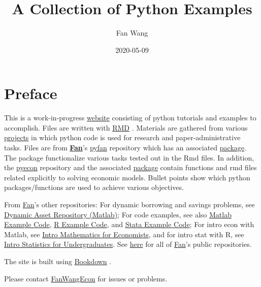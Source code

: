 \documentclass[
]{book}
\title{A Collection of Python Examples}
\author{Fan Wang}
\date{2020-05-09}
\begin{document}
\maketitle

{
\hypersetup{linkcolor=}
\setcounter{tocdepth}{1}
\tableofcontents
}
\hypertarget{preface}{%
\chapter*{Preface}\label{preface}}

This is a work-in-progress \href{https://fanwangecon.github.io/pyfan/}{website} consisting of python tutorials and examples to accomplish. Files are written with \href{https://rmarkdown.rstudio.com/}{RMD} \citep{R-rmarkdown}. Materials are gathered from various \href{https://fanwangecon.github.io/research}{projects} in which python code is used for research and paper-administrative tasks. Files are from \href{https://fanwangecon.github.io/}{\textbf{Fan}}'s \href{https://github.com/FanWangEcon/pyfan}{pyfan} repository which has an associated \href{https://pypi.org/project/pyfan/}{package}. The package functionalize various tasks tested out in the Rmd files. In addition, the \href{https://github.com/FanWangEcon/pyecon}{pyecon} repository and the associated \href{https://pypi.org/project/pyecon/}{package} contain functions and rmd files related explicitly to solving economic models. Bullet points show which python packages/functions are used to achieve various objectives.

From \href{https://fanwangecon.github.io/}{Fan}'s other repositories: For dynamic borrowing and savings problems, see \href{https://fanwangecon.github.io/CodeDynaAsset/}{Dynamic Asset Repository (Matlab)}; For code examples, see also \href{https://fanwangecon.github.io/M4Econ/}{Matlab Example Code}, \href{https://fanwangecon.github.io/R4Econ/}{R Example Code}, and \href{https://fanwangecon.github.io/Stata4Econ/}{Stata Example Code}; For intro econ with Matlab, see \href{https://fanwangecon.github.io/Math4Econ/}{Intro Mathematics for Economists}, and for intro stat with R, see \href{https://fanwangecon.github.io/Stat4Econ/}{Intro Statistics for Undergraduates}. See \href{https://github.com/FanWangEcon}{here} for all of \href{https://fanwangecon.github.io/}{Fan}'s public repositories.

The site is built using \href{https://bookdown.org/}{Bookdown} \citep{R-bookdown}.

Please contact \href{https://fanwangecon.github.io/}{FanWangEcon} for issues or problems.
\end{document}
